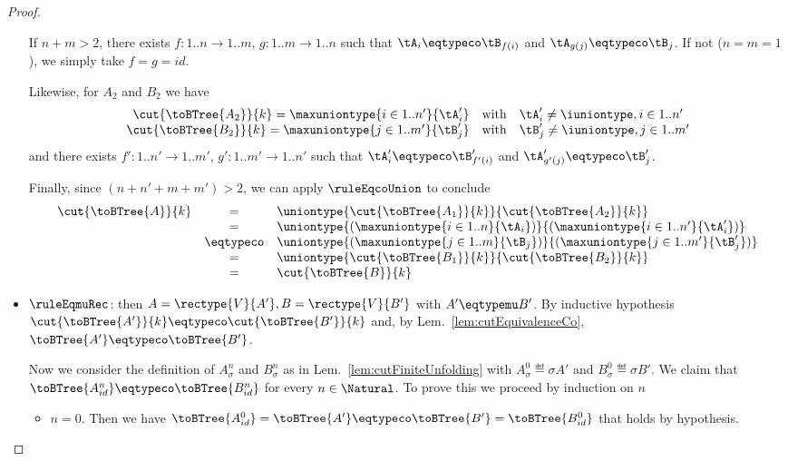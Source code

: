 \begin{proof}
\begin{itemize}
  If $n + m > 2$, there exists $f : 1..n \to 1..m$, $g : 1..m \to 1..n$ such
  that $\tA_i \eqtypeco \tB_{f(i)}$ and $\tA_{g(j)} \eqtypeco \tB_j$. If not
  (\ie $n = m = 1$), we simply take $f = g = \mathit{id}$.
  
  Likewise, for $A_2$ and $B_2$ we have $$
\begin{array}{r@{\quad\text{with}\quad}l}
\cut{\toBTree{A_2}}{k} = \maxuniontype{i \in 1..n'}{\tA'_i} & \tA'_i \neq \iuniontype, i \in 1..n' \\
\cut{\toBTree{B_2}}{k} = \maxuniontype{j \in 1..m'}{\tB'_j} & \tB'_j \neq \iuniontype, j \in 1..m'
\end{array} $$ and there exists $f' : 1..n' \to 1..m'$, $g' : 1..m' \to 1..n'$
  such that $\tA'_i \eqtypeco \tB'_{f'(i)}$ and $\tA'_{g'(j)} \eqtypeco
  \tB'_j$.

  Finally, since $(n + n' + m + m') > 2$, we can apply $\ruleEqcoUnion$ to
  conclude $$
\begin{array}{rcl}
\cut{\toBTree{A}}{k} & =         & \uniontype{\cut{\toBTree{A_1}}{k}}{\cut{\toBTree{A_2}}{k}} \\
                     & =         & \uniontype{(\maxuniontype{i \in 1..n}{\tA_i})}{(\maxuniontype{i \in 1..n'}{\tA'_i})} \\
                     & \eqtypeco & \uniontype{(\maxuniontype{j \in 1..m}{\tB_j})}{(\maxuniontype{j \in 1..m'}{\tB'_j})} \\
                     & =         & \uniontype{\cut{\toBTree{B_1}}{k}}{\cut{\toBTree{B_2}}{k}} \\
                     & =         & \cut{\toBTree{B}}{k}
\end{array} $$
  
  \item $\ruleEqmuRec$: then $A = \rectype{V}{A'}, B = \rectype{V}{B'}$ with
  $A' \eqtypemu B'$. By inductive hypothesis $\cut{\toBTree{A'}}{k} \eqtypeco
  \cut{\toBTree{B'}}{k}$ and, by Lem.~\ref{lem:cutEquivalenceCo}, $\toBTree{A'}
  \eqtypeco \toBTree{B'}$.
  
  Now we consider the definition of $A_\sigma^n$ and $B_\sigma^n$ as in
  Lem.~\ref{lem:cutFiniteUnfolding} with $A_\sigma^0 \eqdef \sigma A'$ and
  $B_\sigma^0 \eqdef \sigma B'$. We claim that $\toBTree{A_{id}^n} \eqtypeco
  \toBTree{B_{id}^n}$ for every $n \in \Natural$. To prove this we proceed by
  induction on $n$
  \begin{itemize}
    \item $n = 0$. Then we have $\toBTree{A_{id}^0} = \toBTree{A'} \eqtypeco
    \toBTree{B'} = \toBTree{B_{id}^0}$ that holds by hypothesis.
    

\end{itemize}
\end{itemize}
\end{proof}
